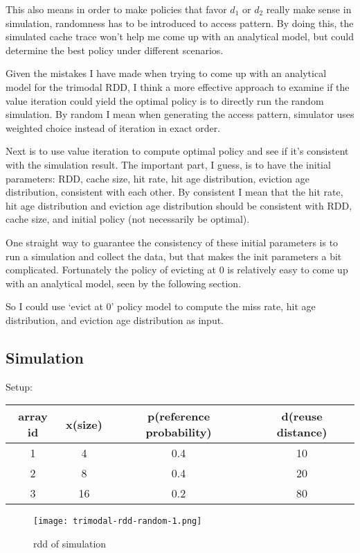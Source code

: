 This also means in order to make policies that favor $d_1$ or $d_2$ really make
sense in simulation, randomness has to be introduced to access pattern. By doing
this, the simulated cache trace won't help me come up with an analytical model,
but could determine the best policy under different scenarios.

Given the mistakes I have made when trying to come up with an analytical model
for the trimodal RDD, I think a more effective approach to examine if the value
iteration could yield the optimal policy is to directly run the random
simulation. By random I mean when generating the access pattern, simulator uses
weighted choice instead of iteration in exact order. 

Next is to use value iteration to compute optimal policy and see if it's
consistent with the simulation result. The important part, I guess, is to have
the initial parameters: RDD, cache size, hit rate, hit age distribution,
eviction age distribution, consistent with each other. By consistent I mean that
the hit rate, hit age distribution and eviction age distribution should be
consistent with RDD, cache size, and initial policy (not necessarily be
optimal). 

One straight way to guarantee the consistency of these initial parameters is to
run a simulation and collect the data, but that makes the init parameters a bit
complicated. Fortunately the policy of evicting at 0 is relatively easy to come
up with an analytical model, seen by the following section.

So I could use `evict at 0' policy model to compute the miss rate, hit age
distribution, and eviction age distribution as input.

\subsection{Simulation}

Setup:
\begin{center}
\begin{tabular}{ c | c c c}
\hline
array id & x(size) & p(reference probability) & d(reuse distance) \\
\hline
1 & 4 & 0.4 & 10 \\
2 & 8 & 0.4 & 20 \\
3 & 16 & 0.2 & 80 \\
\hline
\end{tabular}
\end{center}

\begin{figure}[H]
\centering
\texttt{[image: trimodal-rdd-random-1.png]}
\caption{rdd of simulation}
\end{figure}

